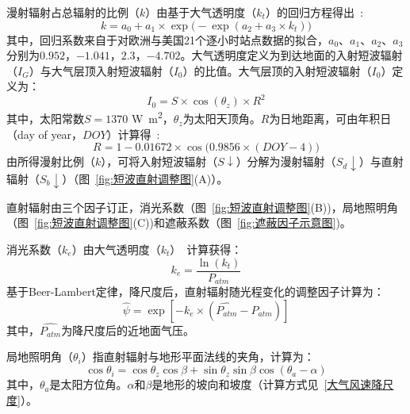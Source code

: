 漫射辐射占总辐射的比例（$k$）由基于大气透明度（$k_{t}$）的回归方程得出~\citep{ruizarias2010}:
\begin{equation}
k=a_{0}+a_{1} \times \exp \big(- \exp \left( a_{2}+a_{3} \times k_{t} \right) \big)
\end{equation}
其中，回归系数来自于对欧洲与美国21个逐小时站点数据的拟合，$a_{0}$、$a_{1}$、$a_{2}$、$a_{3}$分别为$0.952$，$-1.041$，$2.3$，$-4.702$。大气透明度定义为到达地面的入射短波辐射（$I_{G}$）与大气层顶入射短波辐射（$I_{0}$）的比值。大气层顶的入射短波辐射（$I_{0}$）定义为：
\begin{equation}
I_{0}=S \times \cos{\left(\theta_{z}\right)} \times R^{2}
\end{equation}
其中，太阳常数$S=1370$ \unit{W.m^{2}}，$\theta_{z}$为太阳天顶角。$R$为日地距离，可由年积日（day of year，$DOY$）计算得~\citep{eva1998}:
\begin{equation}
R=1-0.01672 \times \cos{\big( 0.9856 \times \left(DOY-4 \right)\big)}
\end{equation}
由所得漫射比例（$k$），可将入射短波辐射（$S\downarrow$）分解为漫射辐射（$S_{d}\downarrow$）与直射辐射（$S_{b}\downarrow$）（图~\ref{fig:短波直射调整图}(A)）。

直射辐射由三个因子订正，消光系数（图~\ref{fig:短波直射调整图}(B))，局地照明角（图~\ref{fig:短波直射调整图}(C))和遮蔽系数（图~\ref{fig:遮蔽因子示意图})。

消光系数（$k_{e}$）由大气透明度（$k_{t}$）~\citep{gupta2016}计算获得：
\begin{equation}
k_{e}=\frac{\ln{\left(k_{t}\right)}}{P_{a t m}}
\end{equation}
基于Beer-Lambert定律，降尺度后，直射辐射随光程变化的调整因子计算为：
\begin{equation}
\hat{\psi}=\exp{\left[ -k_{e} \times \left(\hat{P_{a t m}}-P_{a t m} \right) \right]} 
\end{equation}
其中，$\hat{P_{a t m}}$为降尺度后的近地面气压。

局地照明角（$\theta_{i}$）指直射辐射与地形平面法线的夹角，计算为：
\begin{equation}
\cos{\theta_{i}}=\cos{\theta_{z}}\cos{\beta}+\sin{\theta_{z}}\sin{\beta}\cos{\left(\theta_{a}-\alpha\right)}
\end{equation}
其中，$\theta_{a}$是太阳方位角。$\alpha$和$\beta$是地形的坡向和坡度（计算方式见~\ref{大气风速降尺度}）。

